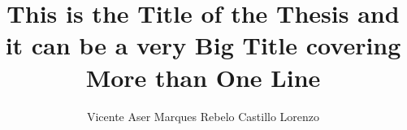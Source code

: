\documentclass[a4paper]{article}
\begin{document}
\title{This is the Title of the Thesis and it can be a very Big Title covering More than One Line} %
\author{Vicente Aser Marques Rebelo Castillo Lorenzo}

\maketitle
\thispagestyle{empty}

\setlength{\abstitleskip}{-\absparindent}


\tableofcontents
\thispagestyle{empty}
\clearpage













\clearpage
{}
\normalem

\ULforem

\clearpage %
\appendix


\end{document}
